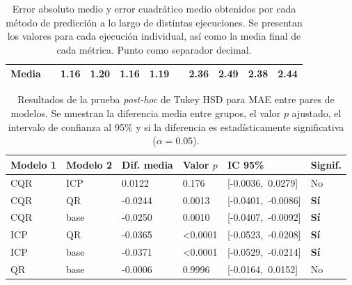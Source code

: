 \begin{table}[h]
\begin{tabular}{clcccclcccc}
    Media                            &  & 1.16          & 1.20         & 1.16        & 1.19         &  & 2.36          & 2.49         & 2.38        & 2.44         \\ 
    \bottomrule
    \end{tabular}
    \caption[
        Error absoluto medio y error cuadrático medio obtenidos por cada método de predicción a lo largo de distintas ejecuciones.
    ]{
        Error absoluto medio y error cuadrático medio obtenidos por cada método de predicción a lo largo de distintas ejecuciones. 
        Se presentan los valores para cada ejecución individual, así como la media final de cada métrica. Punto como separador decimal.
    }
    \label{tab:AE_MAE_MSE_comparative}
\end{table}

\renewcommand{\arraystretch}{1.2}
\begin{table}[h]
    \small
    \centering
    \begin{tabular}{llllll}
    \toprule
    \textbf{Modelo 1} & \textbf{Modelo 2} & \textbf{Dif. media} & \textbf{Valor $p$} & \textbf{IC 95\%} & \textbf{Signif.} \\
    \midrule
    CQR  & ICP   & 0.0122 & 0.176  & [-0.0036,\ 0.0279] & No  \\
    CQR  & QR    & -0.0244 & 0.0013 & [-0.0401,\ -0.0086] & \textbf{Sí} \\
    CQR  & base  & -0.0250 & 0.0010 & [-0.0407,\ -0.0092] & \textbf{Sí} \\
    ICP  & QR    & -0.0365 & \textless 0.0001 & [-0.0523,\ -0.0208] & \textbf{Sí} \\
    ICP  & base  & -0.0371 & \textless 0.0001 & [-0.0529,\ -0.0214] & \textbf{Sí} \\
    QR   & base  & -0.0006 & 0.9996 & [-0.0164,\ 0.0152] & No \\
    \bottomrule
    \end{tabular}
    \caption[
        Resultados de la prueba \textit{post-hoc} de Tukey HSD para MAE entre pares de modelos.
    ]{
        Resultados de la prueba \textit{post-hoc} de Tukey HSD para MAE entre pares de modelos. 
        Se muestran la diferencia media entre grupos, el valor $p$ ajustado, el intervalo de confianza al 95\% y si la diferencia es estadísticamente significativa ($\alpha = 0.05$).
    }
    \label{tab:AE_tukey_mae}
\end{table}

